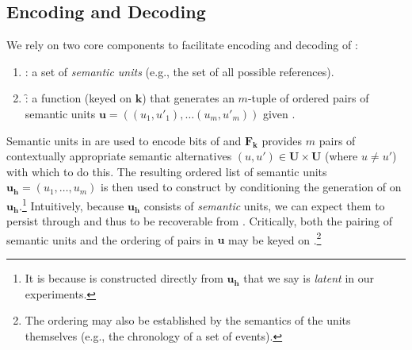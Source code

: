 \subsection{Encoding and Decoding}
\label{subsec:encoding-decoding}
We rely on two core components to facilitate encoding and decoding of \msg:
\begin{enumerate}[itemsep=0pt, parsep=1pt]
    \item \units: a set of \emph{semantic units} (e.g., the set of all possible references).
    \item \f: a function (keyed on $\mathbf{k}$) that generates an $m$-tuple of ordered pairs of semantic units $\mathbf{u} = ((u_1,u'_1),\ldots(u_m,u'_m))$ given \inp.
\end{enumerate}
Semantic units in \units are used to encode bits of \msg and $\mathbf{F}_\mathbf{k}$ provides $m$ pairs of contextually appropriate semantic alternatives $(u,u') \in \mathbf{U} \times \mathbf{U}$ (where $u \neq u'$) with which to do this. The resulting ordered list of semantic units $\mathbf{u_h} = (u_1, \ldots, u_m)$ is then used to construct \stegotext by conditioning the generation of \stegotext on $\mathbf{u}_\mathbf{h}$.\footnote{It is because \stegotext is constructed directly from $\mathbf{u_h}$ that we say \covertext is \emph{latent} in our experiments.} Intuitively, because $\mathbf{u_h}$ consists of \emph{semantic} units, we can expect them to persist through \attack and thus to be recoverable from \attackedtext. Critically, both the pairing of semantic units and the ordering of pairs in $\mathbf{u}$ may be keyed on \key.\footnote{The ordering may also be established by the semantics of the units themselves (e.g., the chronology of a set of events).}


